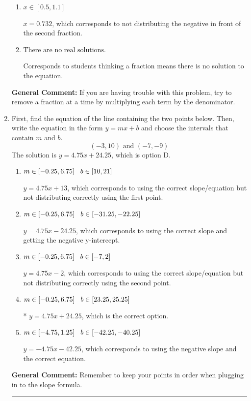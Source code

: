 \documentclass{extbook}[14pt]
\newcommand{\litem}[1]{\item #1

\rule{\textwidth}{0.4pt}}
\begin{document}
\begin{enumerate}
{\begin{enumerate}[label=\Alph*.]
* $x = -2.696$, which is the correct option.
\item \( x \in [0.5, 1.1] \)

 $x = 0.732$, which corresponds to not distributing the negative in front of the second fraction.
\item \( \text{There are no real solutions.} \)

Corresponds to students thinking a fraction means there is no solution to the equation.
\end{enumerate}

\textbf{General Comment:} If you are having trouble with this problem, try to remove a fraction at a time by multiplying each term by the denominator.
}
\litem{
First, find the equation of the line containing the two points below. Then, write the equation in the form $ y=mx+b $ and choose the intervals that contain $m$ and $b$.
\[ (-3, 10) \text{ and } (-7, -9) \]The solution is \( y = 4.75x + 24.25 \), which is option D.\begin{enumerate}[label=\Alph*.]
\item \( m \in [-0.25, 6.75] \hspace*{3mm} b \in [10, 21] \)

 $y = 4.75x + 13$, which corresponds to using the correct slope/equation but not distributing correctly using the first point.
\item \( m \in [-0.25, 6.75] \hspace*{3mm} b \in [-31.25, -22.25] \)

 $y = 4.75x -24.25$, which corresponds to using the correct slope and getting the negative y-intercept.
\item \( m \in [-0.25, 6.75] \hspace*{3mm} b \in [-7, 2] \)

 $y = 4.75x -2$, which corresponds to using the correct slope/equation but not distributing correctly using the second point.
\item \( m \in [-0.25, 6.75] \hspace*{3mm} b \in [23.25, 25.25] \)

* $y = 4.75x + 24.25$, which is the correct option.
\item \( m \in [-4.75, 1.25] \hspace*{3mm} b \in [-42.25, -40.25] \)

 $y = -4.75x -42.25$, which corresponds to using the negative slope and the correct equation.
\end{enumerate}

\textbf{General Comment:} Remember to keep your points in order when plugging in to the slope formula.
}
\end{enumerate}
\end{document}
